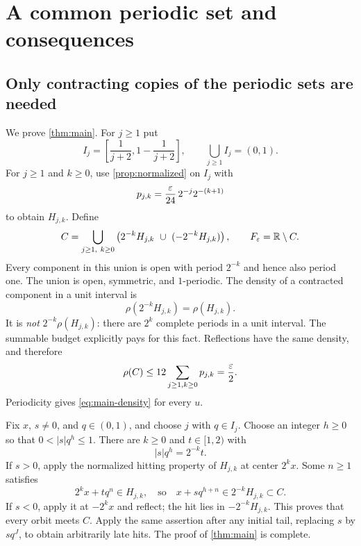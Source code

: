 \section{A common periodic set and consequences}
\label{sec:global}

\subsection{Only contracting copies of the periodic sets are needed}

We prove \cref{thm:main}. For $j\ge1$ put
\begin{equation}\label{eq:ratio-exhaustion}
 I_j=\left[\frac1{j+2},1-\frac1{j+2}\right],
 \qquad \bigcup_{j\ge1}I_j=(0,1).
\end{equation}
For $j\ge1$ and $k\ge0$, use \cref{prop:normalized} on $I_j$ with
\begin{equation}\label{eq:global-budget}
 p_{j,k}=\frac{\varepsilon}{24}\,2^{-j}2^{-(k+1)}
\end{equation}
to obtain $H_{j,k}$. Define
\begin{equation}\label{eq:global-C}
 C=\bigcup_{j\ge1,\ k\ge0}
 \left(2^{-k}H_{j,k}\ \cup\ (-2^{-k}H_{j,k})\right),
 \qquad F_\varepsilon=\mathbb R\setminus C.
\end{equation}
Every component in this union is open with period $2^{-k}$ and hence
also period one. The union is open, symmetric, and $1$-periodic.
The density of a contracted component in a unit interval is
\begin{equation}\label{eq:contraction-density}
 \rho(2^{-k}H_{j,k})=\rho(H_{j,k}).
\end{equation}
It is \emph{not} $2^{-k}\rho(H_{j,k})$: there are $2^k$ complete
periods in a unit interval. The summable budget explicitly pays for
this fact. Reflections have the same density, and therefore
\begin{equation}\label{eq:global-density}
 \rho(C)\le12\sum_{j\ge1,k\ge0}p_{j,k}=\frac{\varepsilon}2.
\end{equation}
Periodicity gives \eqref{eq:main-density} for every $u$.

Fix $x$, $s\ne0$, and $q\in(0,1)$, and choose $j$ with $q\in I_j$.
Choose an integer $h\ge0$ so that $0<|s|q^h\le1$.
There are $k\ge0$ and $t\in[1,2)$ with
\begin{equation}\label{eq:tail-normalization}
 |s|q^h=2^{-k}t.
\end{equation}
If $s>0$, apply the normalized hitting property of $H_{j,k}$ at center
$2^kx$. Some $n\ge1$ satisfies
\[
 2^kx+tq^n\in H_{j,k},
 \quad\text{so}\quad x+sq^{h+n}\in2^{-k}H_{j,k}\subset C.
\]
If $s<0$, apply it at $-2^kx$ and reflect; the hit lies in
$-2^{-k}H_{j,k}$. This proves that every orbit meets $C$.
Apply the same assertion after any initial tail, replacing $s$ by
$sq^J$, to obtain arbitrarily late hits. The proof of
\cref{thm:main} is complete.

